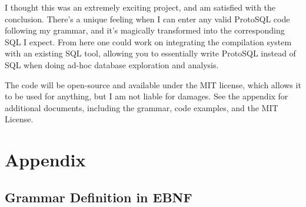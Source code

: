 \documentclass[titlepage]{article}
\begin{document}
		I thought this was an extremely exciting project, and am satisfied with the conclusion.  There's a unique feeling when I can enter any valid ProtoSQL code following my grammar, and it's magically transformed into the corresponding SQL I expect.  From here one could work on integrating the compilation system with an existing SQL tool, allowing you to essentially write ProtoSQL instead of SQL when doing ad-hoc database exploration and analysis.

		The code will be open-source and available under the MIT license, which allows it to be used for anything, but I am not liable for damages.  See the appendix for additional documents, including the grammar, code examples, and the MIT License.

	\section{Appendix}

		\subsection{Grammar Definition in EBNF}
\end{document}
